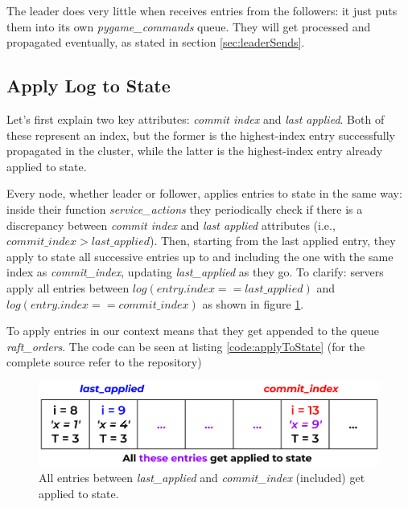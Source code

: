 The leader does very little when receives entries from the followers: it just puts them into its own \textit{pygame\_commands} queue. They will get processed and propagated eventually, as stated in section \ref{sec:leaderSends}.

\subsection{Apply Log to State} \label{sec:applyToState}

Let's first explain two key attributes: \textit{commit index} and \textit{last applied}. Both of these represent an index, but the former is the highest-index entry successfully propagated in the cluster, while the latter is the highest-index entry already applied to state. 

Every node, whether leader or follower, applies entries to state in the same way: inside their function \textit{service\_actions} they periodically check if there is a discrepancy between \textit{commit index} and \textit{last applied} attributes (i.e., $commit\_index > last\_applied$). Then, starting from the last applied entry, they apply to state all successive entries up to and including the one with the same index as \textit{commit\_index}, updating \textit{last\_applied} as they go. To clarify: servers apply all entries between $log(entry.index == last\_applied)$ and $log(entry.index == commit\_index)$ as shown in figure \ref{fig:applyToState}. 

To apply entries in our context means that they get appended to the queue \textit{raft\_orders}. The code can be seen at listing \ref{code:applyToState} (for the complete source refer to the repository)

\begin{figure}[h]
  \centering
  \includegraphics[width=.8\linewidth]{images/applyToState.png}
  \caption{All entries between \textit{last\_applied} and \textit{commit\_index} (included) get applied to state.}
  \label{fig:applyToState}
\end{figure}

